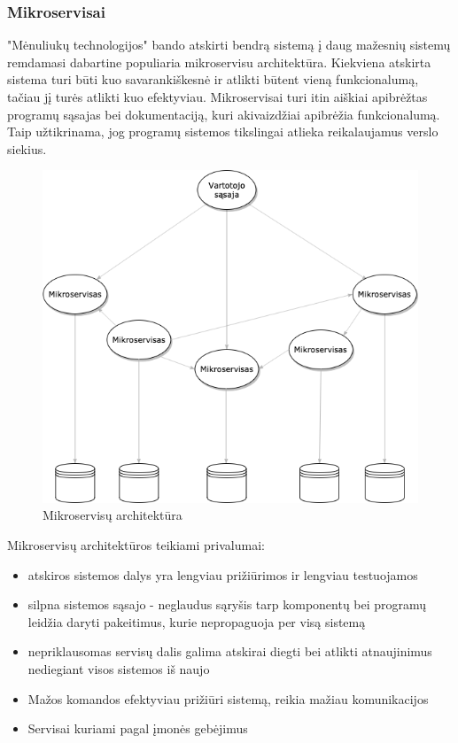 \documentclass{VUMIFPSkursinis}
\begin{document}
		\subsubsection{Mikroservisai}
		\label{mikro} 
		"Mėnuliukų technologijos" bando atskirti bendrą sistemą į daug mažesnių sistemų remdamasi dabartine populiaria mikroservisu architektūra.
		Kiekviena atskirta sistema turi būti kuo savarankiškesnė ir atlikti būtent vieną funkcionalumą, tačiau jį turės atlikti kuo efektyviau.
		Mikroservisai turi itin aiškiai apibrėžtas programų sąsajas bei dokumentaciją, kuri akivaizdžiai apibrėžia funkcionalumą.
		Taip užtikrinama, jog programų sistemos tikslingai atlieka reikalaujamus verslo siekius.

		\begin{figure}[H]
		\centering
		\includegraphics[scale=0.6]{img/micro.png}
		\caption{Mikroservisų architektūra}
		\label{img:mikroservizai}
		\end{figure}
		Mikroservisų architektūros teikiami privalumai:
		\begin{itemize}
			\item{atskiros sistemos dalys yra lengviau prižiūrimos ir lengviau testuojamos}
			\item{silpna sistemos sąsajo - neglaudus sąryšis tarp komponentų bei programų leidžia daryti pakeitimus, kurie nepropaguoja per visą sistemą}
			\item{nepriklausomas servisų dalis galima atskirai diegti bei atlikti atnaujinimus nediegiant visos sistemos iš naujo}
			\item{Mažos komandos efektyviau prižiūri sistemą, reikia mažiau komunikacijos}
			\item{Servisai kuriami pagal įmonės gebėjimus}
		\end{itemize}
		
\end{document}
